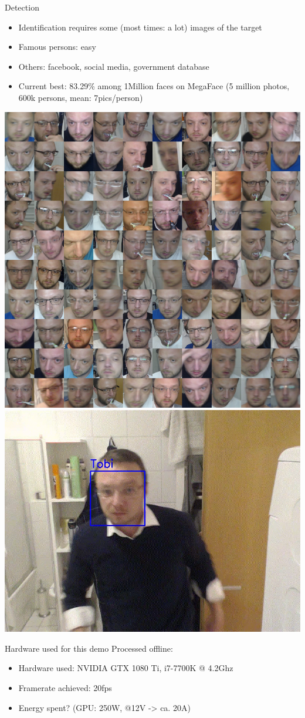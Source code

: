 \documentclass[aspectratio=169]{beamer}
\begin{document}
\begin{frame}{Detection}
	\begin{itemize}
		\item Identification requires some (most times: a lot) images of the target
		\item Famous persons: easy
		\item Others: facebook, social media, government database
		\item Current best: 83.29\% among 1Million faces on MegaFace (5 million photos, 600k persons, mean: 7pics/person)
	\end{itemize}
	\hspace{1.5cm}
	\includegraphics[width=.3\textwidth]{images/mosaic_tobi.png}
	\hspace{1cm}
    \href{run:./videos/face_recog_new.mp4?autostart}
    {\includegraphics[width=.4\linewidth]{images/face_recog.png}}	
\end{frame}

\begin{frame}{Hardware used for this demo}
	Processed offline:
	\begin{itemize}
		\item Hardware used: NVIDIA GTX 1080 Ti, i7-7700K @ 4.2Ghz
		\item Framerate achieved: 20fps
		\item Energy spent? (GPU: 250W, @12V -> ca. 20A)
	\end{itemize}
\end{frame}
\end{document}
